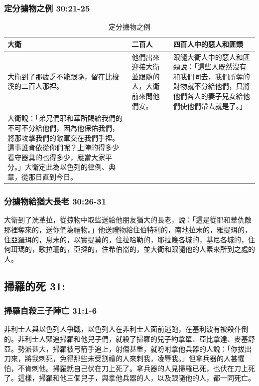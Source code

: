 \subsubsection{定分擄物之例 30:21-25}
\begin{table}[H]
\hspace*{-5mm}
\centering
\begin{tabular}{p{7.5cm}|p{2.75cm}|p{7.5cm}}\hline\hline
大衛&二百人&四百人中的惡人和匪類\\\hline
大衛到了那疲乏不能跟隨，留在比梭溪的二百人那裡。&他們出來迎接大衛並跟隨的人，大衛前來問他們安。&跟隨大衛人中的惡人和匪類說：「這些人既然沒有和我們同去，我們所奪的財物就不分給他們，只將他們各人的妻子兒女給他們使他們帶去就是了。」 \\\hline
大衛說：「弟兄們耶和華所賜給我們的不可不分給他們，因為他保佑我們，將那攻擊我們的敵軍交在我們手裡。這事誰肯依從你們呢？上陣的得多少看守器具的也得多少，應當大家平分。」大衛定此為以色列的律例、典章，從那日直到今日。
&&\\\hline
\end{tabular}
\caption{定分擄物之例}
\end{table}

\subsubsection{分擄物給猶大長老 30:26-31}
大衛到了洗革拉，從掠物中取些送給他朋友猶大的長老，說：「這是從耶和華仇敵那裡奪來的，送你們為禮物。」他送禮物給住伯特利的，南地拉末的，雅提珥的，住亞羅珥的，息末的，以實提莫的，住拉哈勒的，耶拉篾各城的，基尼各城的，住何珥瑪的，歌拉珊的，亞撻的，住希伯崙的，並大衛和跟隨他的人素來所到之處的人。


\subsection{掃羅的死 31:}
\subsubsection{掃羅自殺三子陣亡 31:1-6}
非利士人與以色列人爭戰，以色列人在非利士人面前逃跑，在基利波有被殺仆倒的。非利士人緊追掃羅和他兒子們，就殺了掃羅的兒子約拿單、亞比拿達、麥基舒亞。勢派甚大，掃羅被弓箭手追上，射傷甚重，就吩咐拿他兵器的人說：「你拔出刀來，將我刺死，免得那些未受割禮的人來刺我，凌辱我。」但拿兵器的人甚懼怕，不肯刺他。掃羅就自己伏在刀上死了。拿兵器的人見掃羅已死，也伏在刀上死了。這樣，掃羅和他三個兒子，與拿他兵器的人，以及跟隨他的人，都一同死亡。

